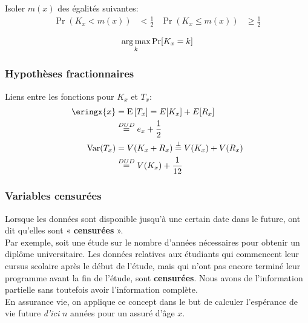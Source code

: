 \documentclass[10pt, french]{article}
\begin{document}
\begin{multicols*}{3}
\begin{definitionNOHFILLprop}[Médiane]
Isoler $m(x)$ des égalités suivantes:
\begin{align*}
	\Pr\left(K_{x} 	<	 m(x)\right)
	&<		\frac{1}{2}	&
	\Pr\left(K_{x} 	\leq	 m(x)\right)
	&\geq	\frac{1}{2} 
\end{align*}
\end{definitionNOHFILLprop}

\begin{definitionNOHFILLprop}[Mode]
\begin{align*}
	\operatorname*{arg\,max}_{k} \text{Pr}[K_x = k]
\end{align*}
\end{definitionNOHFILLprop}


\subsubsection*{Hypothèses fractionnaires}
Liens entre les fonctions pour $K_x$ et $T_x$:\\
\begin{align*}
	\eringx{x} 
	&=	\esp{T_{x}} 
	=	E[K_x] + E[R_x]	\\
	&\overset{DUD}{=}	e_x + \frac{1}{2}	\\
	\text{Var}(T_{x})
	&=	V(K_x + R_x) 
	\overset{\bot}{=}	V(K_x) + V(R_x) \\
	&\overset{DUD}{=}	V(K_x) + \frac{1}{12} 
\end{align*}


\columnbreak
\subsubsection{Variables censurées}
\begin{rappel_enhanced}[Contexte]
Lorsque les données sont disponible jusqu'à une certain date dans le future, ont dit qu'elles sont « \textbf{censurées} ». \\

Par exemple, soit une étude sur le nombre d'années nécessaires pour obtenir un diplôme universitaire. Les données relatives aux étudiants qui commencent leur cursus scolaire après le début de l'étude, mais qui n'ont pas encore terminé leur programme avant la fin de l'étude, sont \textbf{censurées}. Nous avons de l'information partielle sans toutefois avoir l'information complète.\\

En assurance vie, on applique ce concept dans le but de calculer l'espérance de vie future \textit{d'ici} $n$ années pour un assuré d'âge $x$.
\end{rappel_enhanced}



\end{multicols*}
\end{document}
